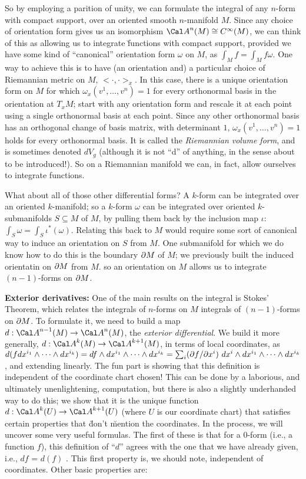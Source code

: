 So by employing a parition of unity, we can formulate the integral of any $n$-form with compact 
support, over an oriented smooth $n$-manifold $M$. Since any choice of orientation form gives us
an isomorphism ${\Cal A}^n(M)\cong C^\infty(M)$, we can think of this as allowing us to integrate
\u{functions} with compact support, provided we have some kind of ``canonical'' orientation form
$\omega$ on $M$, as $\int_M f = \int_M f\omega$. One way to achieve this is to have (an orientation
and) a particular choice of Riemannian metric on $M$, $<\cdot,\cdot>_x$. In this case, there is a
unique orientation form on $M$ for which $\omega_x(v^1,\ldots,v^n)=1$ for every orthonormal basis
in the orientation at $T_xM$; start with any orientation form and rescale it at each point using
a single orthonormal basis at each point. Since any other orthonormal basis has an orthogonal change of
basis matrix, with determinant $1$, $\omega_x(v^1,\ldots,v^n)=1$ holds for every orthonormal basis.
It is called the {\it Riemannian volume form}, and is sometimes denoted $dV_g$ (although it is
not ``d'' of anything, in the sense about to be introduced!).
So on a Riemannian manifold we can, in fact, allow ourselves to integrate functions. 

What about all of those other differential forms? A $k$-form can be integrated over an oriented
$k$-manifold; so a $k$-form $\omega$ can be integrated over oriented $k$-submanifolds $S\subseteq M$
of $M$, by pulling them back by the inclusion map $\iota$: $\int_S\omega = \int_S \iota^*(\omega)$.
Relating this back to $M$ would require some sort of canonical way to induce an orientation on $S$ from $M$.
One submanifold for which we do know how to do this is the boundary $\partial M$ of $M$; we previously
built the induced orientatin on $\partial M$ from $M$. so an orientation on $M$ allows us to
integrate $(n-1)$-forms on $\partial M$. 

\msk

{\bf Exterior derivatives:} One of the main results on the integral is Stokes' Theorem,
which relates the integrals of $n$-forms on $M$ integrals of $(n-1)$-forms on $\partial M$. To formulate it, we 
need to build a map $d:{\Cal A}^{n-1}(M)\ra {\Cal A}^n(M)$, the {\it exterior differential}.
We build it more generally, $d:{\Cal A}^{k}(M)\ra {\Cal A}^{k+1}(M)$, in terms of local coordinates, as
$d(f dx^{i_1}\wedge\cdots\wedge dx^{i_k})=df\wedge dx^{i_1}\wedge\cdots\wedge dx^{i_k}
=\sum_i(\partial f/\partial x^i)\ dx^i\wedge dx^{i_1}\wedge\cdots\wedge dx^{i_k}$, and extending
linearly. The fun part is showing that this definition is independent of the coordinate chart chosen!
This can be done by a laborious, and ultimately unenlightening, computation, but
there is also a slightly underhanded way to do this; we show that it is the unique function
$d:{\Cal A}^{k}(U)\ra {\Cal A}^{k+1}(U)$ (where $U$ is our coordinate chart) that satisfies certain
properties that \u{don't} \u{mention} the coordinates. In the process, we will uncover
some very useful formulas. The first of these is that for a $0$-form (i.e., a function $f$),
this definition of ``$d$'' agrees with the one that we have already given, i.e., $df$ = $d(f)$ .
This first property is, we should note, independent of coordinates. Other basic properties are:

